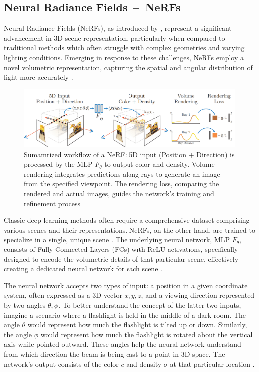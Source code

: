 \subsection{Neural Radiance Fields~--~NeRFs}\label{NeRF}

Neural Radiance Fields (NeRFs), as introduced by \citeauthor{mildenhallNERF}, represent a significant advancement in 3D scene representation, particularly when compared to traditional methods which often struggle with complex geometries and varying lighting conditions. Emerging in response to these challenges, NeRFs employ a novel volumetric representation, capturing the spatial and angular distribution of light more accurately \citep{mildenhallNERF}.

\begin{figure}[ht]
    \centering
      \includegraphics[width=1\columnwidth]{figures/NeRF_Fig_2_Mildenhall.png}
      \caption{Sumamrized workflow of a NeRF\@: 5D input (Position + Direction) is processed by the MLP \(F_\theta\) to output color and density. Volume rendering integrates predictions along rays to generate an image from the specified viewpoint. The rendering loss, comparing the rendered and actual images, guides the network's training and refinement process~\cite{mildenhallNERF}}\label{fig:figureNeRF}
\end{figure}

Classic deep learning methods often require a comprehensive dataset comprising various scenes and their representations. NeRFs, on the other hand, are trained to specialize in a single, unique scene \citep{mildenhallNERF}. The underlying neural network, MLP \(F_\theta\), consists of Fully Connected Layers (FCs) with ReLU activations, specifically designed to encode the volumetric details of that particular scene, effectively creating a dedicated neural network for each scene \citep{mildenhallNERF}. 

The neural network accepts two types of input: a position in a given coordinate system, often expressed as a 3D vector \(x, y, z\), and a viewing direction represented by two angles \( \theta, \phi \). To better understand the concept of the latter two inputs, imagine a scenario where a flashlight is held in the middle of a dark room. The angle \( \theta \) would represent how much the flashlight is tilted up or down. Similarly, the angle \( \phi \) would represent how much the flashlight is rotated about the vertical axis while pointed outward. These angles help the neural network understand from which direction the beam is being cast to a point in 3D space. The network's output consists of the color \(c\) and density \( \sigma \) at that particular location \citep{mildenhallNERF}. 


